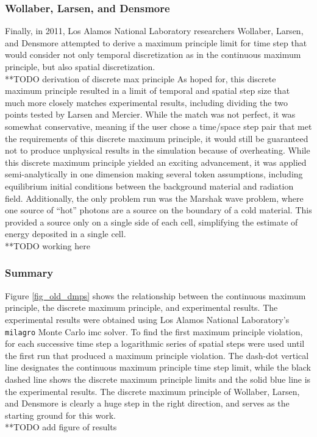 \subsubsection{Wollaber, Larsen, and Densmore}
Finally, in 2011, Los Alamos National Laboratory researchers Wollaber, Larsen, and  Densmore attempted to derive a maximum principle limit for time step that would consider not only temporal discretization as in the continuous maximum principle, but also spatial discretization.
\\ **TODO derivation of discrete max principle
As hoped for, this discrete maximum principle resulted in a limit of temporal and spatial step size that much more closely matches experimental results, including dividing the two points tested by Larsen and Mercier.  While the match was not perfect, it was somewhat conservative, meaning if the user chose a time/space step pair that met the requirements of this discrete maximum principle, it would still be guaranteed not to produce unphysical results in the simulation because of overheating.  While this discrete maximum principle yielded an exciting advancement, it was applied semi-analytically in one dimension making several token assumptions, including equilibrium initial conditions between the background material and radiation field.  Additionally, the only problem run was the Marshak wave problem, where one source of ``hot'' photons are a source on the boundary of a cold material.  This provided a source only on a single side of each cell, simplifying the estimate of energy deposited in a single cell.
\\ **TODO working here

\subsubsection{Summary}
Figure \ref{fig_old_dmps} shows the relationship between the continuous maximum principle, the discrete maximum principle, and experimental results.  The experimental results were obtained using Los Alamos National Laboratory's \texttt{milagro} Monte Carlo \gls{imc} solver.  To find the first maximum principle violation, for each successive time step a logarithmic series of spatial steps were used until the first run that produced a maximum principle violation.  The dash-dot vertical line designates the continuous maximum principle time step limit, while the black dashed line shows the discrete maximum principle limits and the solid blue line is the experimental results.  The discrete maximum principle of Wollaber, Larsen, and Densmore is clearly a huge step in the right direction, and serves as the starting ground for this work.
\\ **TODO add figure of results